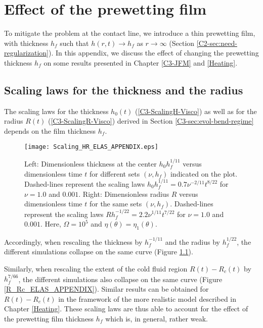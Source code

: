 \chapter{Effect of the prewetting film}
\label{chap:A3}

To  mitigate the  problem at  the contact  line, we  introduce a  thin
prewetting     film,     with     thickness    $h_f$     such     that
$h(r,t)\rightarrow    h_f$   as    $r\rightarrow   \infty$    (Section
\ref{C2-sec:need-regularization}).  In  this appendix, we  discuss the
effect  of changing  the prewetting  thickness $h_f$  on some  results
presented in Chapter \ref{C3-JFM} and \ref{Heating}.

\section{Scaling laws for the thickness and the radius}

The scaling laws for  the thickness $h_0(t)$ (\ref{C3-ScalingH-Visco})
as well as for the  radius $R(t)$ (\ref{C3-ScalingR-Visco}) derived in
Section  \ref{C3-sec:evol-bend-regime} depends  on the  film thickness
$h_f$.
\begin{figure}[h!]
  \begin{center}
    \graphicspath{ {/Users/thorey/Documents/These/Projet/Refroidissement/Skin_Model/Figure/JFM_V13/} }
    \texttt{[image: Scaling\_HR\_ELAS\_APPENDIX.eps]}
    \caption{Left:    Dimensionless    thickness   at    the    center
      $h_0h_f^{1/11}$ versus dimensionless time $t$ for different sets
      $(\nu,h_f)$ indicated  on the plot.  Dashed-lines  represent the
      scaling   laws   $h_0h_f^{1/11}=   0.7\nu^{-2/11}t^{8/22}$   for
      $\nu = 1.0$ and $0.001$.  Right: Dimensionless radius $R$ versus
      dimensionless   time  $t$   for  the   same  sets   $(\nu,h_f)$.
      Dashed-lines       represent        the       scaling       laws
      $Rh_f^{-1/22}=  2.2\nu^{1/11}t^{7/22}$  for   $\nu  =  1.0$  and
      $0.001$.          Here,        $\Omega=         10^5$        and
      $\eta(\theta)=\eta_1(\theta)$.}
    \label{Scaling_HR_ELAS_APPENDIX}
  \end{center}
\end{figure}
Accordingly,  when rescaling  the thickness  by $h_f^{-1/11}$  and the
radius by $h_f^{1/22}$, the different simulations collapse on the same
curve (Figure \ref{Scaling_HR_ELAS_APPENDIX}).

Similarly,  when  rescaling  the  extent  of  the  cold  fluid  region
$R(t)-R_c(t)$ by $h_f^{7/66}$, the different simulations also collapse
on the same curve  (Figure \ref{R_Rc_ELAS_APPENDIX}).  Similar results
can  be  obtained for  $R(t)-R_c(t)$  in  the  framework of  the  more
realistic model described in Chapter \ref{Heating}. These scaling laws
are  thus able  to  account  for the  effect  of  the prewetting  film
thickness $h_f$ which is, in general, rather weak.

